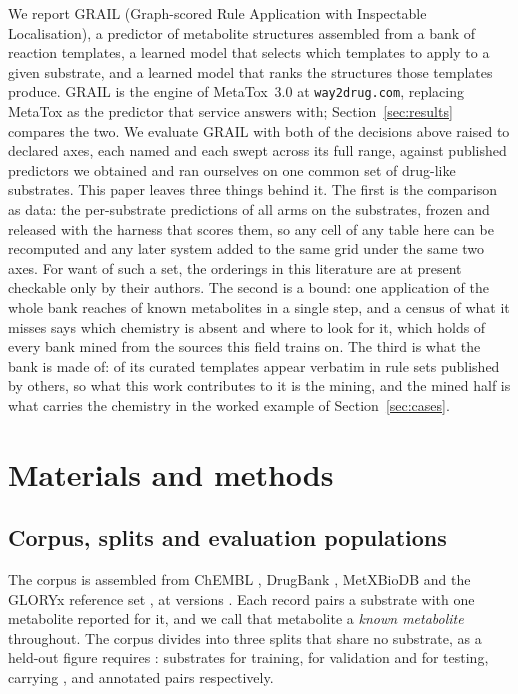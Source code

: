 We report GRAIL (Graph-scored Rule Application with Inspectable Localisation), a predictor of
metabolite structures assembled from a bank of reaction templates, a learned model that selects
which templates to apply to a given substrate, and a learned model that ranks the structures those
templates produce. GRAIL is the engine of MetaTox~3.0 at \texttt{way2drug.com}, replacing MetaTox
\citep{Rudik_2017} as the predictor that service answers with; Section~\ref{sec:results} compares
the two. We evaluate GRAIL with both of the decisions above raised to
declared axes, each named and each swept across its full range, against
\numComparatorsColumnsWord{} published predictors we obtained and ran ourselves on one common set
of drug-like substrates. This paper leaves three
things behind it. The first is the comparison as data: the per-substrate predictions of all
\numArmsTotalWord{} arms on the \numWholeN{} substrates, frozen and released with the harness that
scores them, so any cell of any table here can be recomputed and any later system added to the
same grid under the same two axes. For want of such a set, the orderings in this literature are at
present checkable only by their authors. The second is a bound: one application of the whole bank
reaches \numCeilingCoverage{} of known metabolites in a single step, and a census of what it
misses says which chemistry is absent and where to look for it, which holds of every bank mined
from the sources this field trains on. The third is what the bank is made of:
\numThirdpartyBorrowedsharePct{} of its curated templates appear verbatim in rule sets published
by others, so what this work contributes to it is the mining, and the mined half is what carries
the chemistry in the worked example of Section~\ref{sec:cases}.



\section{Materials and methods}
\label{sec:methods}

\subsection{Corpus, splits and evaluation populations}
\label{sec:populations}

The corpus is assembled from ChEMBL \citep{Zdrazil_2024}, DrugBank \citep{Wishart_2018},
MetXBioDB \citep{Djoumbou_Feunang_2019} and the GLORYx reference set
\citep{de_Bruyn_Kops_2020}, at versions \CorpusVersions{}. Each record pairs a substrate with one
metabolite reported for it, and we call that metabolite a \emph{known metabolite} throughout. The
corpus divides into three splits that share no substrate, as a held-out figure requires
\citep{Joeres_2025, Kretschmer_2025}: \numSplitTrainSubstrates{} substrates for training,
\numSplitValSubstrates{} for validation and \numSplitTestSubstrates{} for testing, carrying
\numSplitTrainPairs{}, \numSplitValPairs{} and \numSplitTestPairs{} annotated pairs respectively.

